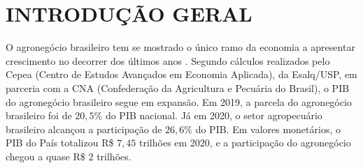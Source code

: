 \documentclass[12pt,a4paper]{article}
\begin{document}
\pagestyle{empty}





\newpage
\pagestyle{empty}




\newpage


\begin{center}
\renewcommand{\listfigurename}{LISTA DE FIGURAS}
\begin{spacing}{1.4}
\listoffigures
\thispagestyle{empty}
\end{spacing}
\end{center}

\newpage

\begin{center}
\renewcommand{\listtablename}{LISTA DE TABELAS}
\begin{spacing}{1.4}
{
\let\oldnumberline\numberline%
\renewcommand{\numberline}{\tablename~\oldnumberline}
\listoftables 
}
\thispagestyle{empty}
\end{spacing}
\end{center}

\newpage

\begin{center}
\renewcommand{\contentsname}{\normalsize{SUMÁRIO}}
\begin{spacing}{1.4}
\tableofcontents
\thispagestyle{empty}
\end{spacing}
\end{center}



\newpage

\section{INTRODUÇÃO GERAL}


O agronegócio brasileiro tem se mostrado o único ramo da economia a apresentar crescimento no decorrer dos últimos anos \cite{guia_20}. Segundo cálculos realizados pelo Cepea (Centro de Estudos Avançados em Economia Aplicada), da Esalq/USP, em parceria com a CNA (Confederação da Agricultura e Pecuária do Brasil), o PIB do agronegócio brasileiro segue em expansão. Em 2019, a parcela do agronegócio brasileiro foi de  $20,5\%$  do PIB nacional. Já em 2020, o setor agropecuário brasileiro alcançou a participação de $26,6\%$ do PIB. Em valores monetários, o PIB do País totalizou R\$ $7,45$ trilhões em 2020, e a participação do agronegócio chegou a quase R\$ $2$ trilhões. 
\end{document}
